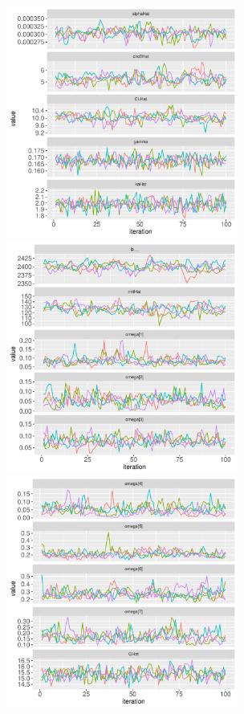 \documentclass[11pt]{amsart}
\begin{document}
\begin{figure}[htbp]
\includegraphics[width=3.0in,trim=0in 0in 0 0in]{graphics/neutropenia_0.82/neutropeniaPopulationPlots001.pdf}
\includegraphics[width=3.0in,trim=0in 0in 0 0in]{graphics/neutropenia_0.82/neutropeniaPopulationPlots002.pdf}
\includegraphics[width=3.0in,trim=0in 0in 0 0in]{graphics/neutropenia_0.82/neutropeniaPopulationPlots003.pdf}

\end{figure}
\end{document}
